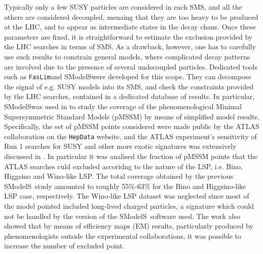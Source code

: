 \documentclass[a4paper,10pt]{article}
\newcommand{\SMO}{{\sc SModelS}}
\newcommand{\FASTLIM}{\texttt{FasLim}}
\begin{document}
Typically only a few SUSY particles are considered in each SMS, and all the others are considered decoupled, menaing that they are too heavy to be produced at the LHC, and to appear as intermediate states in the decay chans. Once these parameters are fixed, it is straightforward to estimate the exclusion provided by the LHC searches in terms of SMS. As a drawback, however, one has to carefully use such results to constrain general models, where complicated decay patterns are involved due to the presence of several undecoupled particles. Dedicated tools such as \FASTLIM and \SMO were developed for this scope. They can decompose the signal of e.g. SUSY models into its SMS, and check the constraints provided by the LHC searches, contained in a dedicated database of results. In particular, \SMO was used in \cite{Ambrogi:2017lov} to study the coverage of the phenomenological Minimal Supersymmetric Standard Models (pMSSM) by means of simplified model results. Specifically, the set of pMSSM points considered were made public by the ATLAS collaboration on the \texttt{HepData} website\cite{ATLASpMSSMhepdata}, and the ATLAS experiment's sensitivity of Run 1 searches for SUSY and other more exotic signatures was extensively discussed in \cite{2015baa}. In particular it was analised the fraction of pMSSM points that the ATLAS searches culd excluded accoridng to the nature of the LSP, i.e. Bino, Higgsino and Wino-like LSP. 
The total coverage obtained by the previous \SMO~study amounted to roughly 55$\%$-63$\%$ for the Bino and Higgsino-like LSP case, respectively. The Wino-like LSP dataset was neglected since most of the model pointed included long-lived charged particles, a signature which could not be handled by the version of the \SMO~software used. The work also showed that by means of efficiency maps (EM) results, particularly produced by phenomenologists outside the experimental collaborations, it was possible to increase the number of excluded point.
\\
\end{document}
